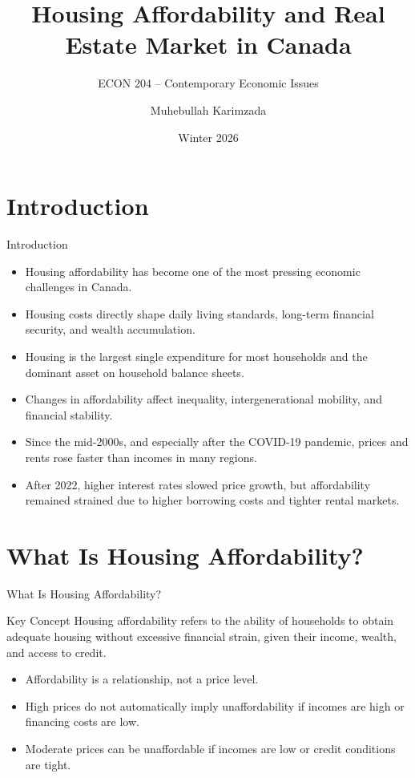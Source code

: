 \documentclass[aspectratio=169]{beamer}
\title[Housing Affordability]{Housing Affordability and Real Estate Market in Canada}
\subtitle{ECON 204 -- Contemporary Economic Issues}
\author{Muhebullah Karimzada}
\date{Winter 2026}
\begin{document}
\maketitle

\section{Introduction}

\begin{frame}{Introduction}
\transfade
\begin{itemize}
  \item Housing affordability has become one of the most pressing economic challenges in Canada.
  \item Housing costs directly shape daily living standards, long-term financial security, and wealth accumulation.
  \item Housing is the largest single expenditure for most households and the dominant asset on household balance sheets.
  \item Changes in affordability affect inequality, intergenerational mobility, and financial stability.
  \item Since the mid-2000s, and especially after the COVID-19 pandemic, prices and rents rose faster than incomes in many regions.
  \item After 2022, higher interest rates slowed price growth, but affordability remained strained due to higher borrowing costs and tighter rental markets.
\end{itemize}
\end{frame}

\section{What Is Housing Affordability?}

\begin{frame}{What Is Housing Affordability?}
\transfade
\begin{block}{Key Concept}
Housing affordability refers to the ability of households to obtain adequate housing without excessive financial strain, given their income, wealth, and access to credit.
\end{block}

\begin{itemize}
  \item Affordability is a relationship, not a price level.
  \item High prices do not automatically imply unaffordability if incomes are high or financing costs are low.
  \item Moderate prices can be unaffordable if incomes are low or credit conditions are tight.
\end{itemize}
\end{frame}
\end{document}
